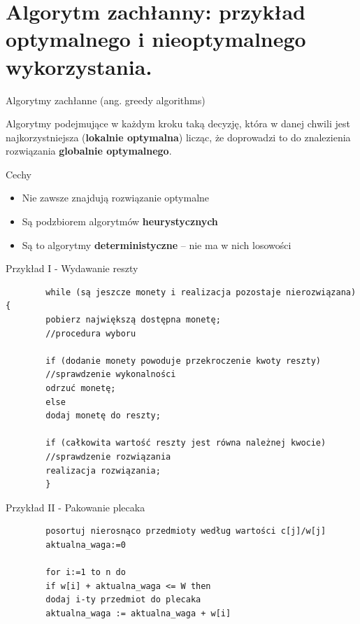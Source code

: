 \documentclass[12pt]{article}
\begin{document}
    \newpage

    \section{Algorytm zachłanny: przykład optymalnego i nieoptymalnego wykorzystania.}

    \begin{definition}
        Algorytmy zachłanne (ang. greedy algorithms)

        Algorytmy podejmujące w każdym kroku taką decyzję, która w danej chwili jest najkorzystniejsza (\textbf{lokalnie optymalna}) licząc, że doprowadzi to do znalezienia rozwiązania \textbf{globalnie optymalnego}.

        Cechy

        \begin{itemize}
            \item Nie zawsze znajdują rozwiązanie optymalne
            \item Są podzbiorem algorytmów \textbf{heurystycznych}
            \item Są to algorytmy \textbf{deterministyczne} – nie ma w nich losowości
        \end{itemize}

    \end{definition}

    Przykład I - Wydawanie reszty

    \begin{verbatim}
        while (są jeszcze monety i realizacja pozostaje nierozwiązana) {
        pobierz największą dostępna monetę;
        //procedura wyboru

        if (dodanie monety powoduje przekroczenie kwoty reszty)
        //sprawdzenie wykonalności
        odrzuć monetę;
        else
        dodaj monetę do reszty;

        if (całkowita wartość reszty jest równa należnej kwocie)
        //sprawdzenie rozwiązania
        realizacja rozwiązania;
        }
    \end{verbatim}

    Przykład II - Pakowanie plecaka

    \begin{verbatim}
        posortuj nierosnąco przedmioty według wartości c[j]/w[j]
        aktualna_waga:=0

        for i:=1 to n do
        if w[i] + aktualna_waga <= W then
        dodaj i-ty przedmiot do plecaka
        aktualna_waga := aktualna_waga + w[i]
    \end{verbatim}
\end{document}
